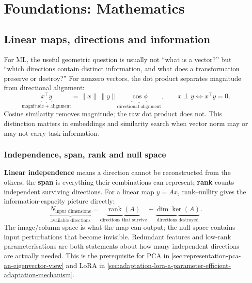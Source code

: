 \chapter{Foundations: Mathematics}
\label{chap:foundations}

\section{Linear maps, directions and information}
\label{sec:foundations-linear-maps-directions-and-information}
\label{sec:la-vector-geometry-and-linear-independence}
\label{sec:la-matrices-as-linear-transformations}

For ML, the useful geometric question is usually not ``what is a vector?'' but ``which directions contain distinct information, and what does a transformation preserve or destroy?''
For nonzero vectors, the dot product separates magnitude from directional alignment:
\[
\underbrace{x^\top y}_{\text{magnitude + alignment}}
=
\|x\|\,\|y\|\underbrace{\cos\phi}_{\text{directional alignment}},
\qquad
x\perp y\iff x^\top y=0.
\]
Cosine similarity removes magnitude; the raw dot product does not.
This distinction matters in embeddings and similarity search when vector norm may or may not carry task information.
\label{subsec:la-dot-product}
\label{subsec:la-orthogonality}


\subsection{Independence, span, rank and null space}
\label{subsec:la-linear-independence}
\label{subsec:la-span-and-rank}
\label{subsec:la-image-space-and-null-space}
\label{subsec:la-singular-matrices}

\textbf{Linear independence} means a direction cannot be reconstructed from the others; the \textbf{span} is everything their combinations can represent; \textbf{rank} counts independent surviving directions.
For a linear map $y=Ax$, rank--nullity gives the information-capacity picture directly:
\begin{equation}
    \underbrace{N_{\text{input dimensions}}}_{\text{available directions}}
    =
    \underbrace{\operatorname{rank}(A)}_{\text{directions that survive}}
    +
    \underbrace{\dim\ker(A)}_{\text{directions destroyed}}
.
\end{equation}
The image/column space is what the map can output; the null space contains input perturbations that become invisible.
Redundant features and low-rank parameterisations are both statements about how many independent directions are actually needed.
This is the prerequisite for PCA in \cref{sec:representation-pca-an-eigenvector-view} and LoRA in \cref{sec:adaptation-lora-a-parameter-efficient-adaptation-mechanism}.


